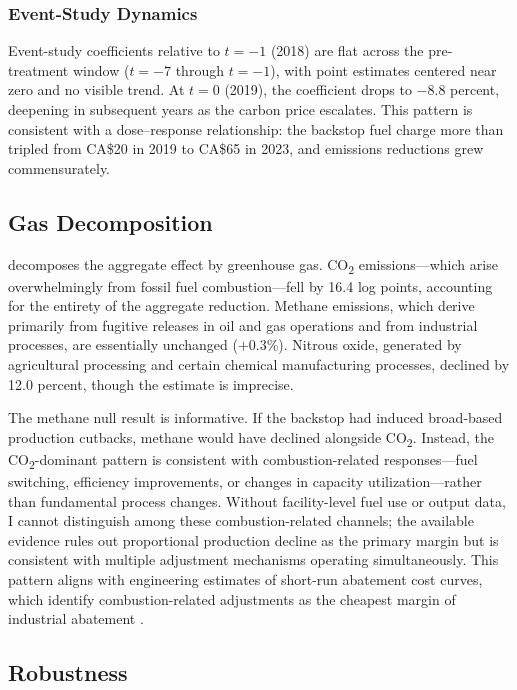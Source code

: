 \documentclass[12pt]{article}
\begin{document}
\subsubsection*{Event-Study Dynamics} Event-study coefficients relative to $t = -1$ (2018) are flat across the pre-treatment window ($t = -7$ through $t = -1$), with point estimates centered near zero and no visible trend. At $t = 0$ (2019), the coefficient drops to $-$8.8 percent, deepening in subsequent years as the carbon price escalates. This pattern is consistent with a dose--response relationship: the backstop fuel charge more than tripled from CA\$20 in 2019 to CA\$65 in 2023, and emissions reductions grew commensurately.


\subsection{Gas Decomposition}



 decomposes the aggregate effect by greenhouse gas. CO\textsubscript{2} emissions---which arise overwhelmingly from fossil fuel combustion---fell by 16.4 log points, accounting for the entirety of the aggregate reduction. Methane emissions, which derive primarily from fugitive releases in oil and gas operations and from industrial processes, are essentially unchanged ($+$0.3\%). Nitrous oxide, generated by agricultural processing and certain chemical manufacturing processes, declined by 12.0 percent, though the estimate is imprecise.

The methane null result is informative. If the backstop had induced broad-based production cutbacks, methane would have declined alongside CO\textsubscript{2}. Instead, the CO\textsubscript{2}-dominant pattern is consistent with combustion-related responses---fuel switching, efficiency improvements, or changes in capacity utilization---rather than fundamental process changes. Without facility-level fuel use or output data, I cannot distinguish among these combustion-related channels; the available evidence rules out proportional production decline as the primary margin but is consistent with multiple adjustment mechanisms operating simultaneously. This pattern aligns with engineering estimates of short-run abatement cost curves, which identify combustion-related adjustments as the cheapest margin of industrial abatement \citep{McKinsey2009, Gillingham2018}.


\subsection{Robustness}
\end{document}
